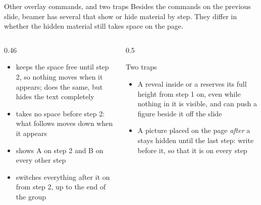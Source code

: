 
\begin{standardframe}{Other overlay commands, and two traps}
	\small
	Besides the commands on the previous slide, beamer has several that show or hide material by step. They differ in whether the hidden material still takes space on the page.
	\par
	\begin{columns}[T,onlytextwidth]
		\begin{column}{0.46\linewidth}
			\begin{itemize}
				\item {} keeps the space free until step 2, so nothing moves when it appears;  does the same, but hides the text completely
				\item {} takes no space before step 2: what follows moves down when it appears
				\item {} shows A on step 2 and B on every other step
				\item {} switches everything after it on from step 2, up to the end of the group
			\end{itemize}
		\end{column}
		\begin{column}{0.5\linewidth}
			\begin{alertblock}{Two traps}
				\begin{itemize}
					\item A reveal inside  or a  reserves its full height from step 1 on, even while nothing in it is visible, and can push a figure beside it off the slide
					\item A picture placed on the page \emph{after} a  stays hidden until the last step: write  before it, so that it is on every step
				\end{itemize}
			\end{alertblock}
		\end{column}
	\end{columns}
\end{standardframe}
